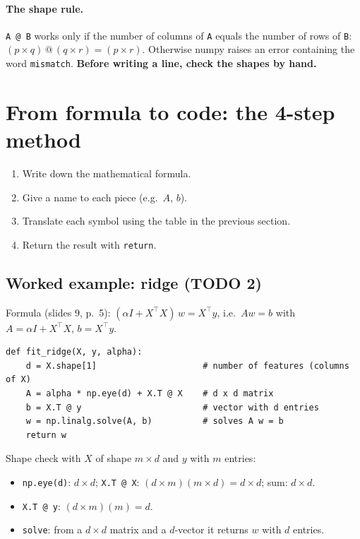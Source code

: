 \documentclass[11pt,a4paper]{article}
\begin{document}
\paragraph{The shape rule.}
\texttt{A @ B} works only if the number of columns of \texttt{A} equals the number of rows of \texttt{B}:
$(p\times q)\,@\,(q\times r) = (p\times r)$. Otherwise numpy raises an error containing the word \texttt{mismatch}.
\textbf{Before writing a line, check the shapes by hand.}

\section{From formula to code: the 4-step method}
\begin{enumerate}
  \item Write down the mathematical formula.
  \item Give a name to each piece (e.g.\ $A$, $b$).
  \item Translate each symbol using the table in the previous section.
  \item Return the result with \texttt{return}.
\end{enumerate}

\subsection{Worked example: ridge (TODO 2)}
Formula (slides 9, p.~5): $(\alpha I + X^\top X)\,w = X^\top y$, i.e.\ $A w = b$ with $A = \alpha I + X^\top X$, $b = X^\top y$.
\begin{lstlisting}
def fit_ridge(X, y, alpha):
    d = X.shape[1]                     # number of features (columns of X)
    A = alpha * np.eye(d) + X.T @ X    # d x d matrix
    b = X.T @ y                        # vector with d entries
    w = np.linalg.solve(A, b)          # solves A w = b
    return w
\end{lstlisting}
Shape check with $X$ of shape $m\times d$ and $y$ with $m$ entries:
\begin{itemize}
  \item \texttt{np.eye(d)}: $d\times d$; \quad \texttt{X.T @ X}: $(d\times m)(m\times d) = d\times d$; \quad sum: $d \times d$. \checkmark
  \item \texttt{X.T @ y}: $(d\times m)(m) = d$. \checkmark
  \item \texttt{solve}: from a $d\times d$ matrix and a $d$-vector it returns $w$ with $d$ entries. \checkmark
\end{itemize}
\end{document}
